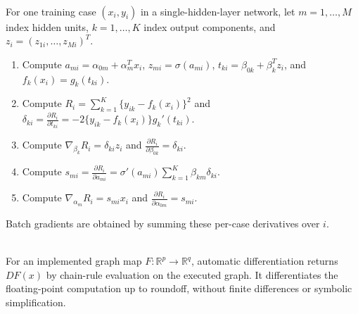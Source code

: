 \begin{method} \label{meth:sl-single-hidden-layer-backprop-equations} \\
For one training case $(x_i,y_i)$ in a single-hidden-layer network, let $m=1,\ldots,M$ index hidden units, $k=1,\ldots,K$ index output components, and $z_i=(z_{1i},\ldots,z_{Mi})^T$.
\begin{enumerate}[label=(\roman*)]
\setlength{\itemsep}{0pt}
\item Compute $a_{mi}=\alpha_{0m}+\alpha_m^Tx_i$, $z_{mi}=\sigma(a_{mi})$, $t_{ki}=\beta_{0k}+\beta_k^Tz_i$, and $f_k(x_i)=g_k(t_{ki})$.
\item Compute $R_i=\sum\limits_{k=1}^K\{y_{ik}-f_k(x_i)\}^2$ and $\delta_{ki}=\frac{\partial R_i}{\partial t_{ki}}=-2\{y_{ik}-f_k(x_i)\}g_k'(t_{ki})$.
\item Compute $\nabla_{\beta_k}R_i=\delta_{ki}z_i$ and $\frac{\partial R_i}{\partial\beta_{0k}}=\delta_{ki}$.
\item Compute $s_{mi}=\frac{\partial R_i}{\partial a_{mi}}=\sigma'(a_{mi})\sum\limits_{k=1}^K\beta_{km}\delta_{ki}$.
\item Compute $\nabla_{\alpha_m}R_i=s_{mi}x_i$ and $\frac{\partial R_i}{\partial\alpha_{0m}}=s_{mi}$.
\end{enumerate}
Batch gradients are obtained by summing these per-case derivatives over $i$.
\end{method}

\begin{remark} \label{rem:sl-autodiff-versus-symbolic} \\
For an implemented graph map $F:\mathbb{R}^p\to\mathbb{R}^q$, automatic differentiation returns $DF(x)$ by chain-rule evaluation on the executed graph.  It differentiates the floating-point computation up to roundoff, without finite differences or symbolic simplification.
\end{remark}
